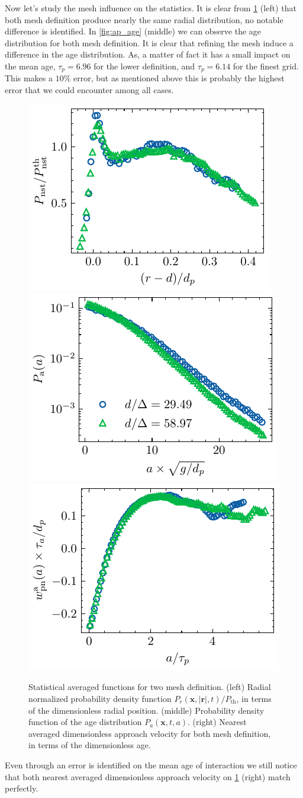 Now let's study the mesh influence on the statistics. 
It is clear from \ref{fig:apstat} (left) that both mesh definition produce nearly the same radial distribution, no notable difference is identified. 
In \ref{fig:ap_age} (middle) we can observe the age distribution for both mesh definition. 
It is clear that refining the mesh induce a difference in the age distribution. 
As, a matter of fact it has a small impact on the mean age, $\tau_p = 6.96$ for the lower definition, and $\tau_p = 6.14$ for the finest grid.
This makes a $10\%$ error, but as mentioned above this is probably the highest error that we could encounter among all cases. 
\begin{figure}
    \centering
    \includegraphics[height = 0.24\textwidth]{image/HOMOGENEOUS_NEW/VAL/Pr.pdf}
    \includegraphics[height = 0.24\textwidth]{image/HOMOGENEOUS_NEW/VAL/Pa.pdf}
    \includegraphics[height = 0.24\textwidth]{image/HOMOGENEOUS_NEW/VAL/w.pdf}
    \caption{
        Statistical averaged functions for two mesh definition. 
        (left) Radial normalized probability density function  $P_r(\textbf{x},|\textbf{r}|,t)/P_\text{th}$, in terms of the dimensionless radial position. 
        (middle) Probability density function of the age distribution $P_a(\textbf{x},t,a)$. 
        (right) Nearest averaged dimensionless approach velocity for both mesh definition, in terms of the dimensionless age. 
    }
    \label{fig:apstat}
\end{figure}
Even through an error is identified on the mean age of interaction we still notice that both nearest averaged dimensionless approach velocity on \ref{fig:apstat} (right) match perfectly. 
